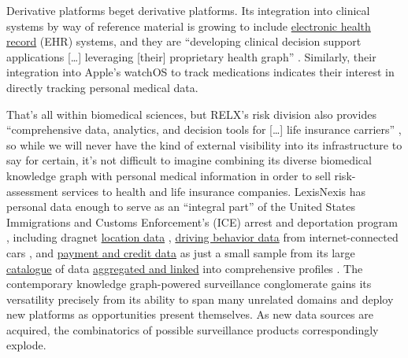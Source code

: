 Derivative platforms beget derivative platforms. Its integration into
clinical systems by way of reference material is growing to include
\href{https://web.archive.org/web/20230307020432/https://www.elsevier.com/en-gb/clinical-solutions/clinical-practice}{electronic
health record} (EHR) systems, and they are ``developing clinical
decision support applications {[}\ldots{]} leveraging {[}their{]}
proprietary health graph'' \cite{relxAnnualReport20222023} .
Similarly, their integration into Apple's watchOS to track medications
indicates their interest in directly tracking personal medical data.

That's all within biomedical sciences, but RELX's risk division also
provides ``comprehensive data, analytics, and decision tools for
{[}\ldots{]} life insurance carriers'' \cite{relxAnnualReport20222023} , so while we will never have the kind of
external visibility into its infrastructure to say for certain, it's not
difficult to imagine combining its diverse biomedical knowledge graph
with personal medical information in order to sell risk-assessment
services to health and life insurance companies. LexisNexis has personal
data enough to serve as an ``integral part'' of the United States
Immigrations and Customs Enforcement's (ICE) arrest and deportation
program \cite{biddleLexisNexisProvideGiant2021, biddleICESearchedLexisNexis2022} , including dragnet
\href{https://web.archive.org/web/20230308034123/https://risk.lexisnexis.com/products/accurint-trax}{location
data} \cite{lexisnexisrisksolutionsAccurintTraX} ,
\href{https://risk.lexisnexis.com/products/telematics-ondemand}{driving
behavior data} from internet-connected cars \cite{lexisnexisrisksolutionsTelematicsOnDemand} , and
\href{https://risk.lexisnexis.com/products/threatmetrix}{payment and
credit data} as just a small sample from its large
\href{https://web.archive.org/web/20230308034302/https://www.lexisnexis.com/pdf/AccurintForLegalProfessionals/24.pdf}{catalogue}
\cite{lexisnexisrisksolutionsAccurintLegalProfessionals2022}  of
data \href{https://risk.lexisnexis.com/our-technology/lexid}{aggregated
and linked} into comprehensive profiles \cite{lexisnexisrisksolutionsLexID} . The contemporary knowledge
graph-powered surveillance conglomerate gains its versatility precisely
from its ability to span many unrelated domains and deploy new platforms
as opportunities present themselves. As new data sources are acquired,
the combinatorics of possible surveillance products correspondingly
explode.

